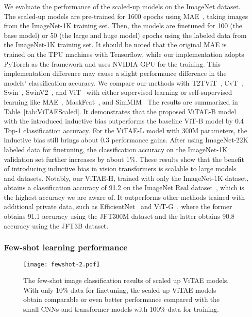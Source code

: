 \documentclass[twocolumn]{svjour3}          \smartqed  \usepackage{natbib}
\begin{document}
We evaluate the performance of the scaled-up models on the ImageNet dataset. The scaled-up models are pre-trained for 1600 epochs using MAE~\citep{he2021masked}, taking images from the ImageNet-1K training set. Then, the models are finetuned for 100 (the base model) or 50 (the large and huge model) epochs using the labeled data from the ImageNet-1K training set. It should be noted that the original MAE is trained on the TPU machines with Tensorflow, while our implementation adopts PyTorch as the framework and uses NVIDIA GPU for the training. This implementation difference may cause a slight performance difference in the models' classification accuracy. We compare our methods with T2TViT~\citep{yuan2021tokens}, CvT~\citep{yuan2021incorporating}, Swin~\citep{liu2021swin}, SwinV2~\citep{swinv2}, and ViT~\citep{dosovitskiy2020image} with either supervised learning or self-supervised learning like MAE~\citep{he2021masked}, MaskFeat~\citep{wei2021masked}, and SimMIM~\citep{xie2021simmim} The results are summarized in Table~\ref{tab:ViTAEScaled}. It demonstrates that the proposed ViTAE-B model with the introduced inductive bias outperforms the baseline ViT-B model by 0.4 Top-1 classification accuracy. For the ViTAE-L model with 300M parameters, the inductive bias still brings about 0.3 performance gains. After using ImageNet-22K labeled data for finetuning, the classification accuracy on the ImageNet-1K validation set further increases by about 1\%. These results show that the benefit of introducing inductive bias in vision transformers is scalable to large models and datasets. Notably, our ViTAE-H, trained with only the ImageNet-1K dataset, obtains a classification accuracy of 91.2 on the ImageNet Real dataset~\citep{beyer2020we}, which is the highest accuracy we are aware of. It outperforms other methods trained with additional private data, such as EfficientNet~\citep{Pham_2021_CVPR} and ViT-G~\citep{zhai2021scaling}, where the former obtains 91.1 accuracy using the JFT300M dataset and the latter obtains 90.8 accuracy using the JFT3B dataset.

\subsubsection{Few-shot learning performance}

\begin{figure}
    \centering
    \texttt{[image: fewshot-2.pdf]}
    \caption{The few-shot image classification results of scaled up ViTAE models. With only 10\% data for finetuning, the scaled up ViTAE models obtain comparable or even better performance compared with the small CNNs and transformer models with 100\% data for training.}
    \label{fig:ViTAEFewShot}
\end{figure}
\end{document}
